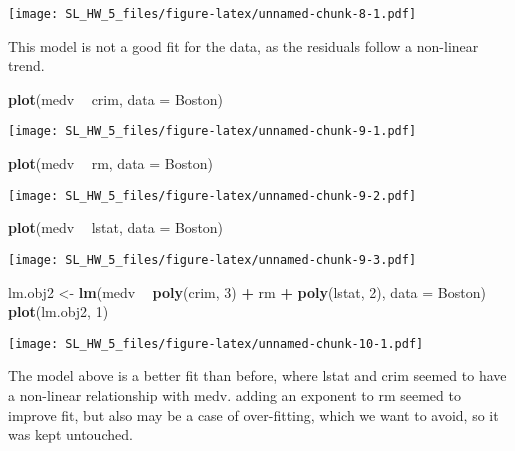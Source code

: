 \documentclass[]{article}
\newenvironment{Shaded}{\begin{snugshade}}{\end{snugshade}}
\newcommand{\DataTypeTok}[1]{\textcolor[rgb]{0.13,0.29,0.53}{#1}}
\newcommand{\DecValTok}[1]{\textcolor[rgb]{0.00,0.00,0.81}{#1}}
\newcommand{\KeywordTok}[1]{\textcolor[rgb]{0.13,0.29,0.53}{\textbf{#1}}}
\newcommand{\NormalTok}[1]{#1}
\newcommand{\OperatorTok}[1]{\textcolor[rgb]{0.81,0.36,0.00}{\textbf{#1}}}
\newcommand{\StringTok}[1]{\textcolor[rgb]{0.31,0.60,0.02}{#1}}
\begin{document}
\texttt{[image: SL\_HW\_5\_files/figure-latex/unnamed-chunk-8-1.pdf]}

This model is not a good fit for the data, as the residuals follow a
non-linear trend.

\begin{Shaded}
\begin{Highlighting}[]
\KeywordTok{plot}\NormalTok{(medv }\OperatorTok{~}\StringTok{ }\NormalTok{crim, }\DataTypeTok{data =}\NormalTok{ Boston)}
\end{Highlighting}
\end{Shaded}

\texttt{[image: SL\_HW\_5\_files/figure-latex/unnamed-chunk-9-1.pdf]}

\begin{Shaded}
\begin{Highlighting}[]
\KeywordTok{plot}\NormalTok{(medv }\OperatorTok{~}\StringTok{ }\NormalTok{rm, }\DataTypeTok{data =}\NormalTok{ Boston)}
\end{Highlighting}
\end{Shaded}

\texttt{[image: SL\_HW\_5\_files/figure-latex/unnamed-chunk-9-2.pdf]}

\begin{Shaded}
\begin{Highlighting}[]
\KeywordTok{plot}\NormalTok{(medv }\OperatorTok{~}\StringTok{ }\NormalTok{lstat, }\DataTypeTok{data =}\NormalTok{ Boston)}
\end{Highlighting}
\end{Shaded}

\texttt{[image: SL\_HW\_5\_files/figure-latex/unnamed-chunk-9-3.pdf]}

\begin{Shaded}
\begin{Highlighting}[]
\NormalTok{lm.obj2 <-}\StringTok{ }\KeywordTok{lm}\NormalTok{(medv }\OperatorTok{~}\StringTok{ }\KeywordTok{poly}\NormalTok{(crim, }\DecValTok{3}\NormalTok{) }\OperatorTok{+}\StringTok{ }\NormalTok{rm }\OperatorTok{+}\StringTok{ }\KeywordTok{poly}\NormalTok{(lstat, }\DecValTok{2}\NormalTok{), }\DataTypeTok{data =}\NormalTok{ Boston)}
\KeywordTok{plot}\NormalTok{(lm.obj2, }\DecValTok{1}\NormalTok{)}
\end{Highlighting}
\end{Shaded}

\texttt{[image: SL\_HW\_5\_files/figure-latex/unnamed-chunk-10-1.pdf]}

The model above is a better fit than before, where lstat and crim seemed
to have a non-linear relationship with medv. adding an exponent to rm
seemed to improve fit, but also may be a case of over-fitting, which we
want to avoid, so it was kept untouched.
\end{document}
